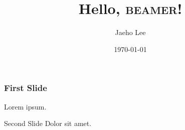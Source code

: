 \documentclass{beamer}
\title{Hello, \textsc{beamer}!}
\author{Jaeho Lee}
\date{\today}
\begin{document}
\maketitle
\begin{frame}
  \frametitle{First Slide}
  Lorem ipsum.
\end{frame}
\begin{frame}{Second Slide}
  Dolor sit amet.
\end{frame}
\end{document}
